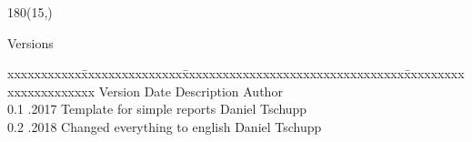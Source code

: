 
\begin{textblock}{180}(15,\VersionControlPosY)
\color{black}
\begin{huge}
Versions
\end{huge}
\vspace{10mm}

\fontsize{10pt}{18pt}\selectfont
\begin{tabbing}
xxxxxxxxxxx\=xxxxxxxxxxxxxxx\=xxxxxxxxxxxxxxxxxxxxxxxxxxxxxxxxx\=xxxxxxxxxxxxxxxxxxxxxx\kill
Version	\> Date			\> Description					\> Author			\\
0.1		.2017 	\> Template for simple reports	\> Daniel Tschupp	\\
0.2		.2018 	\> Changed everything to english\> Daniel Tschupp	\\		
\end{tabbing}

\end{textblock}

\cleardoubleemptypage	